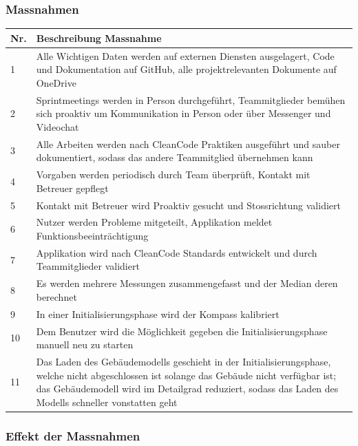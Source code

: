 \documentclass[a4paper]{scrreprt}
\begin{document}
\subsubsection{Massnahmen}

\begin{tabular}{|p{}|p{}|}
	\hline
	\textbf{Nr.} & \textbf{Beschreibung Massnahme} \\
	\hline
	1 & Alle Wichtigen Daten werden auf externen Diensten ausgelagert, Code und Dokumentation auf GitHub, alle projektrelevanten Dokumente auf OneDrive\\
	\hline
	2 & Sprintmeetings werden in Person durchgeführt, Teammitglieder bemühen sich proaktiv um Kommunikation in Person oder über Messenger und Videochat\\
	\hline
	3 & Alle Arbeiten werden nach CleanCode Praktiken ausgeführt und sauber dokumentiert, sodass das andere Teammitglied übernehmen kann\\
	\hline
	4 & Vorgaben werden periodisch durch Team überprüft, Kontakt mit Betreuer gepflegt\\
	\hline
	5 & Kontakt mit Betreuer wird Proaktiv gesucht und Stossrichtung validiert\\
	\hline
	6 & Nutzer werden Probleme mitgeteilt, Applikation meldet Funktionsbeeinträchtigung\\
	\hline
	7 & Applikation wird nach CleanCode Standards entwickelt und durch Teammitglieder validiert\\
	\hline
	8 & Es werden mehrere Messungen zusammengefasst und der Median deren berechnet\\
	\hline
	9 & In einer Initialisierungsphase wird der Kompass kalibriert\\
	\hline
	10 & Dem Benutzer wird die Möglichkeit gegeben die Initialisierungsphase manuell neu zu starten\\
	\hline
	11 & Das Laden des Gebäudemodells geschieht in der Initialisierungsphase, welche nicht abgeschlossen ist solange das Gebäude nicht verfügbar ist; das Gebäudemodell wird im Detailgrad reduziert, sodass das Laden des Modells schneller vonstatten geht\\
	\hline
\end{tabular}

\subsubsection{Effekt der Massnahmen}
\end{document}
